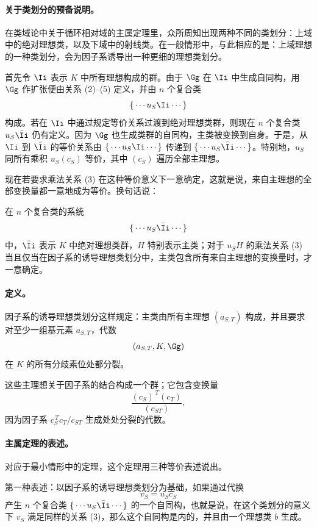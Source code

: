 \paragraph{关于类划分的预备说明。}
在类域论中关于循环相对域的主属定理里，众所周知出现两种不同的类划分：上域中的绝对理想类，以及下域中的射线类。在一般情形中，与此相应的是：上域理想的一种类划分，会为因子系诱导出一种更细的理想类划分。

首先令 \(\Ii\) 表示 \(K\) 中所有理想构成的群。由于 \(\Gg\) 在 \(\Ii\) 中生成自同构，用 \(\Gg\) 作扩张便由关系 (2)--(5) 定义，并由 \(n\) 个复合类
\[
        \{\,\cdots u_S\Ii\cdots\,\}
\]
构成。若在 \(\Ii\) 中通过规定等价关系过渡到绝对理想类群，则现在 \(n\) 个复合类 \(u_S\bar\Ii\) 仍有定义。因为 \(\Gg\) 也生成类群的自同构，主类被变换到自身。于是，从 \(\Ii\) 到 \(\bar\Ii\) 的等价关系由 \(\{\,\cdots u_S\Ii\cdots\,\}\) 传递到 \(\{\,\cdots u_S\bar\Ii\cdots\,\}\)。特别地，\(u_S\) 同所有乘积 \(u_S(c_S)\) 等价，其中 \((c_S)\) 遍历全部主理想。

现在若要求乘法关系 (3) 在这种等价意义下一意确定，这就是说，来自主理想的全部变换量都一意地成为等价。换句话说：

在 \(n\) 个复合类的系统
\[
        \{\,\cdots u_S\bar\Ii\cdots\,\}
\]
中，\(\bar\Ii\) 表示 \(K\) 中绝对理想类群，\(H\) 特别表示主类；对于 \(u_SH\) 的乘法关系 (3) 当且仅当在因子系的诱导理想类划分中，主类包含所有来自主理想的变换量时，才一意确定。

\paragraph{定义。}
因子系的诱导理想类划分这样规定：主类由所有主理想 \((a_{S,T})\) 构成，并且要求对至少一组基元素 \(a_{S,T}\)，代数
\[
        (a_{S,T},K,\Gg)
\]
在 \(K\) 的所有分歧素位处都分裂。

这些主理想关于因子系的结合构成一个群；它包含变换量
\[
        \frac{(c_S)^{\,T}(c_T)}{(c_{ST})},
\]
因为因子系 \(c_S^{\,T}c_T/c_{ST}\) 生成处处分裂的代数。

\paragraph{主属定理的表述。}
对应于最小情形中的定理，这个定理用三种等价表述说出。

第一种表述：以因子系的诱导理想类划分为基础，如果通过代换
\[
        v_S=u_S c_S
\]
产生 \(n\) 个复合类 \(\{\,\cdots u_S\bar\Ii\cdots\,\}\) 的一个自同构，也就是说，在这个类划分的意义下 \(v_S\) 满足同样的关系 (3)，那么这个自同构是内的，并且由一个理想类 \(b\) 生成。

